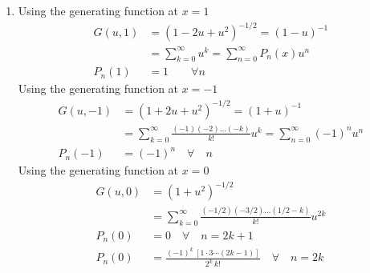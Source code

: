 \begin{enumerate}
\begin{enumerate}
              \item Using the generating function at $ x = 1 $
                    \begin{align}
                        G(u, 1) & = (1 - 2u + u^2)^{-1/2} = (1-u)^{-1} \\
                                & = \sum_{k=0}^{\infty} u^k
                        = \sum_{n=0}^{\infty} P_n(x) u^n               \\
                        P_n (1) & = 1 \qquad \forall n
                    \end{align}
                    Using the generating function at $ x = -1 $
                    \begin{align}
                        G(u, -1) & = (1 + 2u + u^2)^{-1/2} = (1+u)^{-1} \\
                                 & = \sum_{k=0}^{\infty}
                        \frac{(-1)(-2)\dots(-k)}{k!} u^k
                        = \sum_{n=0}^{\infty} (-1)^n u^n                \\
                        P_n (-1) & = (-1)^n \quad \forall \quad n
                    \end{align}
                    Using the generating function at $ x = 0 $
                    \begin{align}
                        G(u, 0) & = (1 + u^2)^{-1/2}                         \\
                                & = \sum_{k=0}^{\infty}
                        \frac{(-1/2)(-3/2)\dots(1/2 - k)}{k!} u^{2k}         \\
                        P_n (0) & = 0 \quad \forall \quad n = 2k+1           \\
                        P_n(0)  & = \frac{(-1)^k\ [1 \cdot 3 \cdots (2k-1)]}
                        {2^k\ k!} \quad \forall \quad n = 2k
                    \end{align}
          \end{enumerate}


\end{enumerate}
